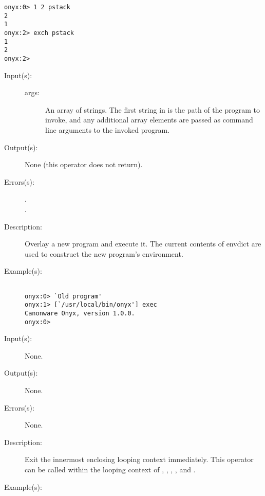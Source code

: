 \begin{description}
\begin{description}
\begin{verbatim}
onyx:0> 1 2 pstack
2
1
onyx:2> exch pstack
1
2
onyx:2>
		\end{verbatim}
	\end{description}
\label{systemdict:exec}
\item[{\onyxop{args}{exec}{--}}: ]
	\begin{description}\item[]
	\item[Input(s): ]
		\begin{description}\item[]
		\item[args: ]
			An array of strings.  The first string in 
			is the path of the program to invoke, and any additional
			array elements are passed as command line arguments to
			the invoked program.
		\end{description}
	\item[Output(s): ] None (this operator does not return).
	\item[Errors(s): ]
		\begin{description}\item[]
		\item[.]
		\item[.]
		\end{description}
	\item[Description: ]
		Overlay a new program and execute it.  The current contents of
		envdict are used to construct the new program's environment.
	\item[Example(s): ]\begin{verbatim}

onyx:0> `Old program'
onyx:1> [`/usr/local/bin/onyx'] exec
Canonware Onyx, version 1.0.0.
onyx:0>
		\end{verbatim}
	\end{description}
\label{systemdict:exit}
\item[{\onyxop{--}{exit}{--}}: ]
	\begin{description}\item[]
	\item[Input(s): ] None.
	\item[Output(s): ] None.
	\item[Errors(s): ] None.
	\item[Description: ]
		Exit the innermost enclosing looping context immediately.
		This operator can be called within the looping context of
		,
		,
		,
		, and
		.
	\item[Example(s): ]\begin{verbatim}


\end{verbatim}
\end{description}
\end{description}
